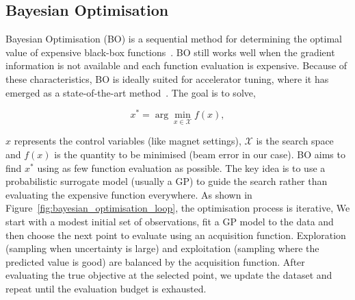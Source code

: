 \subsection{Bayesian Optimisation}
Bayesian Optimisation (BO) is a sequential method for determining the optimal value of expensive black-box functions~\cite{roussel2024bo}. BO still works well when the gradient information 
is not available and each function evaluation is expensive. Because of these characteristics, BO is ideally suited for accelerator tuning, where it has emerged as a state-of-the-art 
method~\cite{jalas2021bolaserplasma,Duris2020bofreelectron}. The goal is to solve,

\begin{equation}
    \label{eq_optFormulation}
    x^* = \arg\min_{x \in \mathcal{X}} f(x),
\end{equation}

$x$ represents the control variables (like magnet settings), $\mathcal{X}$ is the search space and $f(x)$ is the quantity to be minimised (beam error in our case). BO aims to find $x^*$ using as 
few function evaluation as possible. The key idea is to use a probabilistic surrogate model (usually a GP) to guide the search rather than evaluating the expensive function everywhere. 
As shown in Figure~\ref{fig:bayesian_optimisation_loop}, the optimisation process is iterative, We start with a modest initial set of observations, fit a GP model to the data and then choose the next point to evaluate using an acquisition function.
Exploration (sampling when uncertainty is large) and exploitation (sampling where the predicted value is good) are balanced by the acquisition function. After evaluating the true objective at the 
selected point, we update the dataset and repeat until the evaluation budget is exhausted.

